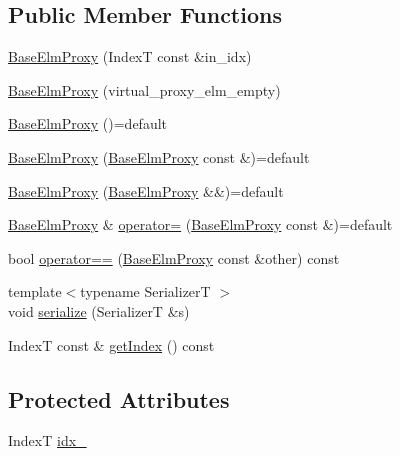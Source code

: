\subsection*{Public Member Functions}
\begin{DoxyCompactItemize}
\item 
\hyperlink{structvt_1_1vrt_1_1collection_1_1_base_elm_proxy_a3158c9990dc4e32c1589804328f816f0}{Base\+Elm\+Proxy} (IndexT const \&in\+\_\+idx)
\item 
\hyperlink{structvt_1_1vrt_1_1collection_1_1_base_elm_proxy_ab6419a69aa754dfc38c6a3c779765b1a}{Base\+Elm\+Proxy} (virtual\+\_\+proxy\+\_\+elm\+\_\+empty)
\item 
\hyperlink{structvt_1_1vrt_1_1collection_1_1_base_elm_proxy_ad57eaf8904028e67f2ef719b055686fc}{Base\+Elm\+Proxy} ()=default
\item 
\hyperlink{structvt_1_1vrt_1_1collection_1_1_base_elm_proxy_a85d73db08cdb024b53641ad9d815997a}{Base\+Elm\+Proxy} (\hyperlink{structvt_1_1vrt_1_1collection_1_1_base_elm_proxy}{Base\+Elm\+Proxy} const \&)=default
\item 
\hyperlink{structvt_1_1vrt_1_1collection_1_1_base_elm_proxy_a35fe7ab51f205eeb6a58716472461972}{Base\+Elm\+Proxy} (\hyperlink{structvt_1_1vrt_1_1collection_1_1_base_elm_proxy}{Base\+Elm\+Proxy} \&\&)=default
\item 
\hyperlink{structvt_1_1vrt_1_1collection_1_1_base_elm_proxy}{Base\+Elm\+Proxy} \& \hyperlink{structvt_1_1vrt_1_1collection_1_1_base_elm_proxy_a1476221ddb300382b04f2e8fb4a0adfe}{operator=} (\hyperlink{structvt_1_1vrt_1_1collection_1_1_base_elm_proxy}{Base\+Elm\+Proxy} const \&)=default
\item 
bool \hyperlink{structvt_1_1vrt_1_1collection_1_1_base_elm_proxy_a793fdd9d1bac6b5974f8579781bad7ab}{operator==} (\hyperlink{structvt_1_1vrt_1_1collection_1_1_base_elm_proxy}{Base\+Elm\+Proxy} const \&other) const
\item 
{\footnotesize template$<$typename SerializerT $>$ }\\void \hyperlink{structvt_1_1vrt_1_1collection_1_1_base_elm_proxy_ab4d3d05dd4576d7554f7b211c8f6bfc1}{serialize} (SerializerT \&s)
\item 
IndexT const  \& \hyperlink{structvt_1_1vrt_1_1collection_1_1_base_elm_proxy_a9f68c8d29d3fc1f646f01c9ff890e71b}{get\+Index} () const
\end{DoxyCompactItemize}
\subsection*{Protected Attributes}
\begin{DoxyCompactItemize}
\item 
IndexT \hyperlink{structvt_1_1vrt_1_1collection_1_1_base_elm_proxy_a3c3a673dc49a7e03703b899e6b135d47}{idx\+\_\+}
\end{DoxyCompactItemize}


